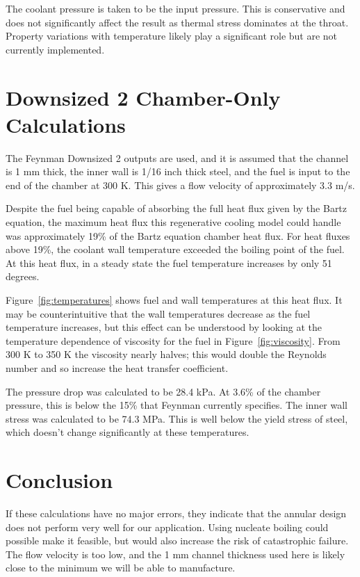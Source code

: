 \documentclass[11pt]{article}
\begin{document}
The coolant pressure is taken to be the input pressure. This is conservative and does not significantly affect the result as thermal stress dominates at the throat. Property variations with temperature likely play a significant role but are not currently implemented.

\section{Downsized 2 Chamber-Only Calculations}

The Feynman Downsized 2 outputs are used, and it is assumed that the channel is 1 mm thick, the inner wall is 1/16 inch thick steel, and the fuel is input to the end of the chamber at 300 K. This gives a flow velocity of approximately 3.3 m/s.

Despite the fuel being capable of absorbing the full heat flux given by the Bartz equation, the maximum heat flux this regenerative cooling model could handle was approximately 19\% of the Bartz equation chamber heat flux. For heat fluxes above 19\%, the coolant wall temperature exceeded the boiling point of the fuel. At this heat flux, in a steady state the fuel temperature increases by only 51 degrees.

Figure~\ref{fig:temperatures} shows fuel and wall temperatures at this heat flux. It may be counterintuitive that the wall temperatures decrease as the fuel temperature increases, but this effect can be understood by looking at the temperature dependence of viscosity for the fuel in Figure~\ref{fig:viscosity}. From 300 K to 350 K the viscosity nearly halves; this would double the Reynolds number and so increase the heat transfer coefficient.

The pressure drop was calculated to be 28.4 kPa. At 3.6\% of the chamber pressure, this is below the 15\% that Feynman currently specifies. The inner wall stress was calculated to be 74.3 MPa. This is well below the yield stress of steel, which doesn't change significantly at these temperatures.

\section{Conclusion}

If these calculations have no major errors, they indicate that the annular design does not perform very well for our application. Using nucleate boiling could possible make it feasible, but would also increase the risk of catastrophic failure. The flow velocity is too low, and the 1 mm channel thickness used here is likely close to the minimum we will be able to manufacture.
\end{document}
